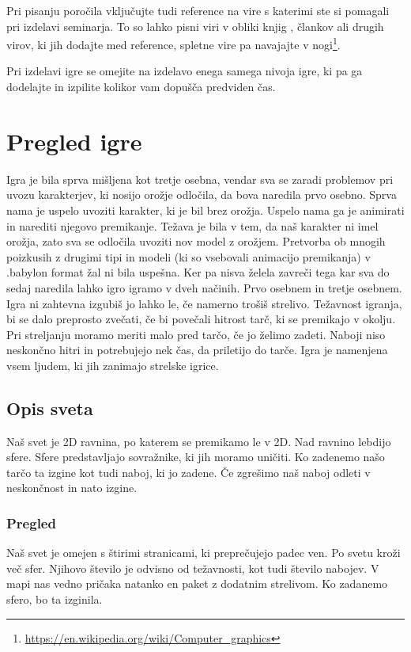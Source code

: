 \documentclass[a4paper]{article}
\begin{document}
Pri pisanju poročila vključujte tudi reference na vire s katerimi ste si pomagali pri izdelavi seminarja. To so lahko pisni viri v obliki knjig \cite{Foley1994}, člankov \cite{Meng2015} ali drugih virov, ki jih dodajte med reference, spletne vire pa navajajte v nogi\footnote{\url{https://en.wikipedia.org/wiki/Computer_graphics}}.

Pri izdelavi igre se omejite na izdelavo enega samega nivoja igre, ki pa ga dodelajte in izpilite kolikor vam do\-pu\-šča predviden čas.




\section{Pregled igre}
Igra je bila sprva mišljena kot tretje osebna, vendar sva se zaradi problemov pri uvozu karakterjev, ki nosijo orožje odločila, da bova naredila prvo osebno.
Sprva nama je uspelo uvoziti karakter, ki je bil brez orožja. Uspelo nama ga je animirati in narediti njegovo premikanje.
Težava je bila v tem, da naš karakter ni imel orožja, zato sva se odločila uvoziti nov model z orožjem. 
Pretvorba ob mnogih poizkusih z drugimi tipi in modeli (ki so vsebovali animacijo premikanja) v .babylon format žal ni bila uspešna.
Ker pa nisva želela zavreči tega kar sva do sedaj naredila lahko igro igramo v dveh načinih. Prvo osebnem in tretje osebnem.
Igra ni zahtevna izgubiš jo lahko le, če namerno trošiš strelivo. Težavnost igranja, bi se dalo preprosto zvečati, če bi povečali hitrost tarč, ki se premikajo v okolju.
Pri streljanju moramo meriti malo pred tarčo, če jo želimo zadeti. Naboji niso neskončno hitri in potrebujejo nek čas, da priletijo do tarče.
Igra je namenjena vsem ljudem, ki jih zanimajo strelske igrice.


\subsection{Opis sveta}
Naš svet je 2D ravnina, po katerem se premikamo le v 2D. Nad ravnino lebdijo sfere. Sfere predstavljajo sovražnike, ki jih moramo uničiti.
Ko zadenemo našo tarčo ta izgine kot tudi naboj, ki jo zadene. Če zgrešimo naš naboj odleti v neskončnost in nato izgine.

\subsubsection{Pregled}
Naš svet je omejen s štirimi stranicami, ki preprečujejo padec ven. Po svetu kroži več sfer. Njihovo število je odvisno od težavnosti, kot tudi
število nabojev. V mapi nas vedno pričaka natanko en paket z dodatnim strelivom. Ko zadanemo sfero, bo ta izginila.
\end{document}
